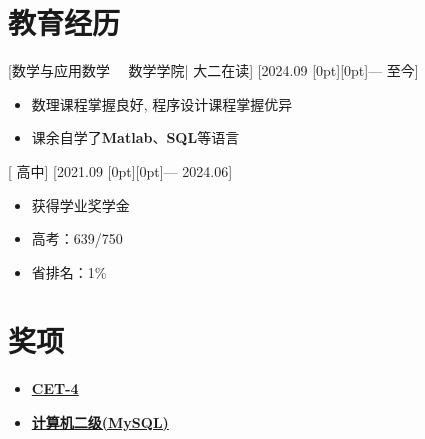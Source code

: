 \documentclass{resume}
\begin{document}


\ResumeTitle


\section{教育经历}
[\textnormal{数学与应用数学 \ \ 数学学院|}  大二在读]
[2024.09   \raisebox{0.2ex}[0pt][0pt]{{\small —}} 至今]
\begin{itemize}
 \item 数理课程掌握良好, 程序设计课程掌握优异
 \item 课余自学了\textbf{Matlab}、\textbf{SQL}等语言
\end{itemize}

[\textnormal{} 高中]
[2021.09 \raisebox{0.2ex}[0pt][0pt]{{\small —}} 2024.06]
\begin{itemize}
 \item 获得学业奖学金
 \item 高考：639/750 
 \item 省排名：1\%
\end{itemize}

\section{奖项}


\begin{itemize}
  \item \href {https://ecert.neea.edu.cn/api/pdf/down/1/a54aa4d8ad8d4cc2b4aeada8e858d0d608b8faddf3672256639c2ecbb3fcb6a4a7fd95c1562cfc9eb4905f000eccdaec82114c4bc50c33218f375804b6ce852a59a76d24825f9436a0f120c76263516409f20cdda4cf6ad146eed5ae0fdf6d33f90553309caf21ef3f6fa0d7da55330497de3d9acab75400e1301f08ce84cd65.pdf?tab=CET4_202506&from=list} 
              {\textbf{CET-4}}
  \item \href {https://ecert.neea.edu.cn/api/pdf/down/2/df23b23a330ea9e79da81b6a11132610b9420d66b942b7ecb8c4f33b6b465dfe72547d983f0faf7a0b55dab83e7f4d0a15c8dccbd52834ca6f630a18bbce91c2b43b0f5d905a9b38a4732479b0da9f2020a64fa83f8dce4ebb43ae942901c0670e74d583db32b47ce41e1ad968874706ba9870e3de92696b3387dfcee012799c.pdf?tab=NCRE_202509&from=list} 
              {\textbf{计算机二级(MySQL)}}
\end{itemize}
\end{document}
